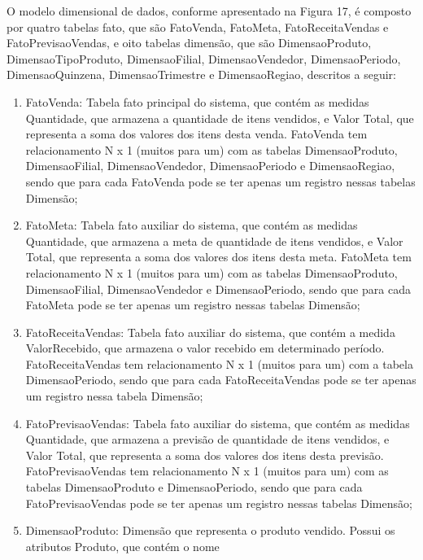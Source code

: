\documentclass[a4paper]{article}
\newcommand\liststyleWWviiiNumxvii{%
\renewcommand\theenumi{\alph{enumi}}
\renewcommand\theenumii{\alph{enumii}}
\renewcommand\theenumiii{\roman{enumiii}}
\renewcommand\theenumiv{\arabic{enumiv}}
\renewcommand\labelenumi{\theenumi)}
\renewcommand\labelenumii{\theenumii.}
\renewcommand\labelenumiii{\theenumiii.}
\renewcommand\labelenumiv{\theenumiv.}
}
\begin{document}
{
\textsf{O modelo dimensional de dados, conforme apresentado na Figura 17, \'e composto por quatro tabelas fato, que
s\~ao FatoVenda, FatoMeta, FatoReceitaVendas e FatoPrevisaoVendas, e oito tabelas dimens\~ao, que s\~ao
DimensaoProduto, DimensaoTipoProduto, DimensaoFilial, DimensaoVendedor, DimensaoPeriodo, DimensaoQuinzena,
DimensaoTrimestre e DimensaoRegiao, descritos a seguir:}}

\liststyleWWviiiNumxvii
\begin{enumerate}
\item {
\textsf{FatoVenda: Tabela fato principal do sistema, que cont\'em as medidas Quantidade, que armazena a quantidade de
itens vendidos, e Valor Total, que representa a soma dos valores dos itens desta venda. FatoVenda tem relacionamento N
x 1 (muitos para um) com as tabelas DimensaoProduto, DimensaoFilial, DimensaoVendedor, DimensaoPeriodo e
DimensaoRegiao, sendo que para cada FatoVenda pode se ter apenas um registro nessas tabelas Dimens\~ao;}}
\item {
\textsf{FatoMeta: Tabela fato auxiliar do sistema, que cont\'em as medidas Quantidade, que armazena a meta de quantidade
de itens vendidos, e Valor Total, que representa a soma dos valores dos itens desta meta. FatoMeta tem relacionamento N
x 1 (muitos para um) com as tabelas DimensaoProduto, }\textsf{DimensaoFilial, DimensaoVendedor e DimensaoPeriodo, sendo
que para cada FatoMeta pode se ter apenas um registro nessas tabelas Dimens\~ao; }}
\item {
\textsf{FatoReceitaVendas: Tabela fato auxiliar do sistema, que cont\'em a medida ValorRecebido, que armazena o valor
recebido em determinado per\'iodo. FatoReceitaVendas tem relacionamento N x 1 (muitos para um) com a tabela
DimensaoPeriodo, sendo que para cada FatoReceitaVendas pode se ter apenas um registro nessa tabela Dimens\~ao;}}
\item {
\textsf{FatoPrevisaoVendas: Tabela fato auxiliar do sistema, que cont\'em as medidas Quantidade, que armazena a
previs\~ao de quantidade de itens vendidos, e Valor Total, que representa a soma dos valores dos itens desta
previs\~ao. FatoPrevisaoVendas tem relacionamento N x 1 (muitos para um) com as tabelas DimensaoProduto e
DimensaoPeriodo, sendo que para cada FatoPrevisaoVendas pode se ter apenas um registro nessas tabelas Dimens\~ao;}}
\item {
\textsf{DimensaoProduto: Dimens\~ao que representa o produto vendido. Possui os atributos Produto, que cont\'em o nome
}}
\end{enumerate}
\end{document}
